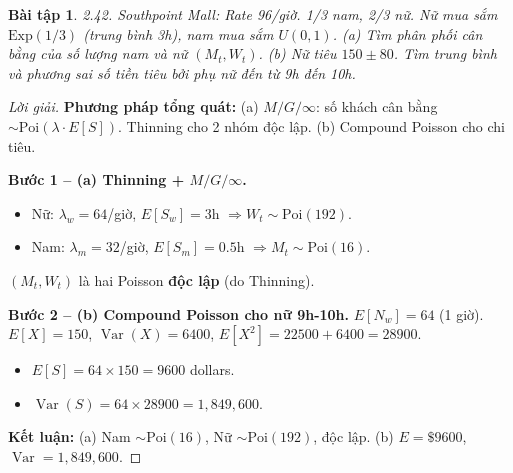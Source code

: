 \documentclass[8pt,a4paper]{article}
\newtheorem{exercise}{Bài tập}
\newenvironment{solution}{\begin{proof}[Lời giải]}{\end{proof}}
\newcommand{\Var}{\operatorname{Var}}
\begin{document}
\begin{exercise}
2.42. Southpoint Mall: Rate 96/giờ. 1/3 nam, 2/3 nữ. Nữ mua sắm $\text{Exp}(1/3)$ (trung bình 3h), nam mua sắm $U(0, 1)$.
(a) Tìm phân phối cân bằng của số lượng nam và nữ $(M_t, W_t)$.
(b) Nữ tiêu $150 \pm 80$. Tìm trung bình và phương sai số tiền tiêu bởi phụ nữ đến từ 9h đến 10h.
\end{exercise}
\begin{solution}
\textbf{Phương pháp tổng quát:} (a) $M/G/\infty$: số khách cân bằng $\sim \text{Poi}(\lambda \cdot E[S])$. Thinning cho 2 nhóm độc lập. (b) Compound Poisson cho chi tiêu.

\textbf{Bước 1 -- (a) Thinning + $M/G/\infty$.}
\begin{itemize}[nosep]
  \item Nữ: $\lambda_w = 64$/giờ, $E[S_w] = 3$h $\Rightarrow W_t \sim \text{Poi}(192)$.
  \item Nam: $\lambda_m = 32$/giờ, $E[S_m] = 0.5$h $\Rightarrow M_t \sim \text{Poi}(16)$.
\end{itemize}
$(M_t, W_t)$ là hai Poisson \textbf{độc lập} (do Thinning).

\textbf{Bước 2 -- (b) Compound Poisson cho nữ 9h-10h.} $E[N_w] = 64$ (1 giờ). $E[X] = 150$, $\Var(X) = 6400$, $E[X^2] = 22500 + 6400 = 28900$.
\begin{itemize}[nosep]
  \item $E[S] = 64 \times 150 = \boxed{9600}$ dollars.
  \item $\Var(S) = 64 \times 28900 = \boxed{1{,}849{,}600}$.
\end{itemize}

\textbf{Kết luận:} (a) Nam $\sim \text{Poi}(16)$, Nữ $\sim \text{Poi}(192)$, độc lập. (b) $E = \$9600$, $\Var = 1{,}849{,}600$.
\end{solution}
\end{document}
